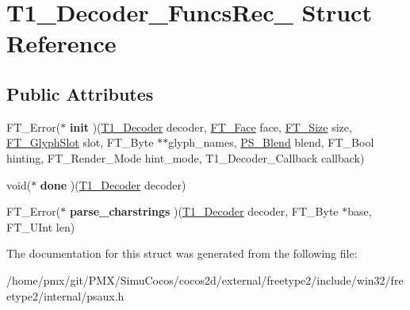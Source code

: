 \hypertarget{structT1__Decoder__FuncsRec__}{}\section{T1\+\_\+\+Decoder\+\_\+\+Funcs\+Rec\+\_\+ Struct Reference}
\label{structT1__Decoder__FuncsRec__}
\subsection*{Public Attributes}
\begin{DoxyCompactItemize}
\item 
\mbox{\label{structT1__Decoder__FuncsRec___a10baf5f433631fb6e73e639fca7e9478}} 
F\+T\+\_\+\+Error($\ast$ {\bfseries init} )(\hyperlink{structT1__DecoderRec__}{T1\+\_\+\+Decoder} decoder, \hyperlink{structFT__FaceRec__}{F\+T\+\_\+\+Face} face, \hyperlink{structFT__SizeRec__}{F\+T\+\_\+\+Size} size, \hyperlink{structFT__GlyphSlotRec__}{F\+T\+\_\+\+Glyph\+Slot} slot, F\+T\+\_\+\+Byte $\ast$$\ast$glyph\+\_\+names, \hyperlink{structPS__BlendRec__}{P\+S\+\_\+\+Blend} blend, F\+T\+\_\+\+Bool hinting, F\+T\+\_\+\+Render\+\_\+\+Mode hint\+\_\+mode, T1\+\_\+\+Decoder\+\_\+\+Callback callback)
\item 
\mbox{\label{structT1__Decoder__FuncsRec___a2d76ed11eab173c09dc8f5cde75a64ee}} 
void($\ast$ {\bfseries done} )(\hyperlink{structT1__DecoderRec__}{T1\+\_\+\+Decoder} decoder)
\item 
\mbox{\label{structT1__Decoder__FuncsRec___a921b7ac2c00f97c425643c5a612b3c38}} 
F\+T\+\_\+\+Error($\ast$ {\bfseries parse\+\_\+charstrings} )(\hyperlink{structT1__DecoderRec__}{T1\+\_\+\+Decoder} decoder, F\+T\+\_\+\+Byte $\ast$base, F\+T\+\_\+\+U\+Int len)
\end{DoxyCompactItemize}


The documentation for this struct was generated from the following file\+:\begin{DoxyCompactItemize}
\item 
/home/pmx/git/\+P\+M\+X/\+Simu\+Cocos/cocos2d/external/freetype2/include/win32/freetype2/internal/psaux.\+h\end{DoxyCompactItemize}
